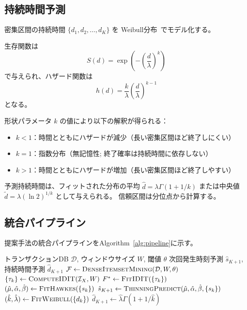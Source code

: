 \subsection{持続時間予測}

密集区間の持続時間 $\{d_1, d_2, \ldots, d_K\}$ を
Weibull分布~\cite{weibull1951statistical}でモデル化する。

生存関数は
\begin{equation}
  S(d) = \exp\left(-\left(\frac{d}{\lambda}\right)^k\right)
\end{equation}
で与えられ、ハザード関数は
\begin{equation}
  h(d) = \frac{k}{\lambda}\left(\frac{d}{\lambda}\right)^{k-1}
\end{equation}
となる。

形状パラメータ $k$ の値により以下の解釈が得られる：
\begin{itemize}
  \item $k < 1$：時間とともにハザードが減少（長い密集区間ほど終了しにくい）
  \item $k = 1$：指数分布（無記憶性; 終了確率は持続時間に依存しない）
  \item $k > 1$：時間とともにハザードが増加（長い密集区間ほど終了しやすい）
\end{itemize}

予測持続時間は、フィットされた分布の平均
$\hat{d} = \lambda \Gamma(1 + 1/k)$
または中央値
$\tilde{d} = \lambda (\ln 2)^{1/k}$
として与えられる。
信頼区間は分位点から計算する。

\subsection{統合パイプライン}

提案手法の統合パイプラインをAlgorithm~\ref{alg:pipeline}に示す。

\begin{algorithm}[t]
\caption{Dense Interval Prediction Pipeline}
\label{alg:pipeline}
\begin{algorithmic}[1]
\Require トランザクションDB $\mathcal{D}$, ウィンドウサイズ $W$, 閾値 $\theta$
\Ensure 次回発生時刻予測 $\hat{s}_{K+1}$, 持続時間予測 $\hat{d}_{K+1}$
\State $\mathcal{F} \gets \textsc{DenseItemsetMining}(\mathcal{D}, W, \theta)$
  \State $\{\tau_k\} \gets \textsc{ComputeIDIT}(\mathcal{I}_X, W)$
  \State $F^* \gets \textsc{FitIDIT}(\{\tau_k\})$ 
  \State $(\hat{\mu}, \hat{\alpha}, \hat{\beta}) \gets \textsc{FitHawkes}(\{s_k\})$
  \State $\hat{s}_{K+1} \gets \textsc{ThinningPredict}(\hat{\mu}, \hat{\alpha}, \hat{\beta}, \{s_k\})$
  \State $(\hat{k}, \hat{\lambda}) \gets \textsc{FitWeibull}(\{d_k\})$
  \State $\hat{d}_{K+1} \gets \hat{\lambda} \Gamma(1 + 1/\hat{k})$
\EndFor
\end{algorithmic}
\end{algorithm}

